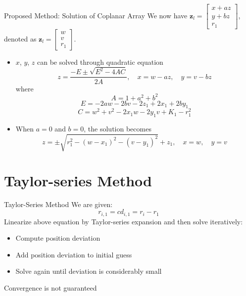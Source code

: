 \documentclass[10pt]{beamer}
\begin{document}
\begin{frame}{Proposed Method: Solution of Coplanar Array}
  We now have $\mathbf{z}_l=\begin{bmatrix}x+az\\y+bz\\r_1\end{bmatrix}$,
  denoted as $\mathbf{z}_l=\begin{bmatrix}w\\v\\r_1\end{bmatrix}$.
  \begin{itemize}
    \item $x$, $y$, $z$ can be solved through quadratic equation
          $$z=\frac{-E\pm\sqrt{E^2-4AC}}{2A},\quad x=w-az,\quad y=v-bz$$
          where$$A=1+a^2+b^2$$
          $$E=-2aw-2bv-2z_1+2x_1+2by_1$$
          $$C=w^2+v^2-2x_1w-2y_1v+K_1-r_1^2$$
    \item When $a=0$ and $b=0$, the solution becomes
          $$z=\pm\sqrt{r_1^2-(w-x_1)^2-(v-y_1)^2}+z_1,\quad x=w,\quad y=v$$
  \end{itemize}
\end{frame}

\section{Taylor-series Method}

\begin{frame}{Taylor-Series Method}
	We are given:
  $$ r_{i,1}=cd_{i,1}=r_{i}-r_{1} $$
  Linearize above equation by Taylor-series expansion and then solve iteratively:
	\begin{itemize}
    \item Compute position deviation
    \item Add position deviation to initial guess
    \item Solve again until deviation is considerably small
  \end{itemize}
  \alert{Convergence is not guaranteed}
\end{frame}
\end{document}
